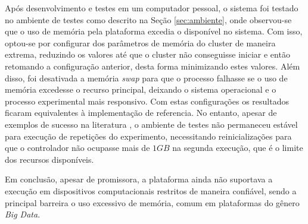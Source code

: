 Após desenvolvimento e testes em um computador pessoal, o sistema foi testado no
ambiente de testes como descrito na Seção \ref{sec:ambiente}, onde observou-se
que o uso de memória pela plataforma \flink excedia o disponível no sistema.
Com isso, optou-se por configurar dos parâmetros de memória do cluster
de maneira extrema, reduzindo os valores até que o cluster não conseguisse
iniciar e então retomando a configuração anterior, desta forma minimizando estes
valores.
Além disso, foi desativada a memória \emph{swap} para que o processo falhasse se
o uso de memória excedesse o recurso principal, deixando o sistema operacional e
o processo experimental mais responsivo.
Com estas configurações os resultados ficaram equivalentes à implementação de
referencia.
No entanto, apesar de exemplos de sucesso na literatura
\cite{lee2017data,Greco2019wearableStream,battulga2020fogguru}, o ambiente de
testes não permaneceu estável para execução de repetições do experimento,
necessitando reinicializações para que o controlador não ocupasse mais de $1GB$
na segunda execução, que é o limite dos recursos disponíveis.

Em conclusão, apesar de promissora, a plataforma \flink ainda não suportava a
execução em dispositivos computacionais restritos de maneira confiável, sendo a
principal barreira o uso excessivo de memória, comum em plataformas do gênero
\emph{Big Data}.

